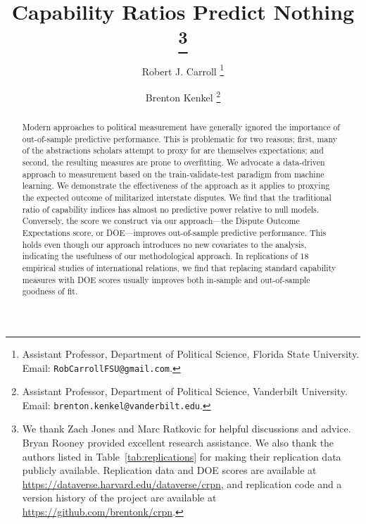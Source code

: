 \documentclass[11pt,oneside]{article}
\title{
  Capability Ratios Predict Nothing%
  \thanks{%
    We thank Zach Jones and Marc Ratkovic for helpful discussions and advice.
    Bryan Rooney provided excellent research assistance.
    We also thank the authors listed in Table~\ref{tab:replications} for making their replication data publicly available.
    Replication data and DOE scores are available at \url{https://dataverse.harvard.edu/dataverse/crpn}, and replication code and a version history of the project are available at \url{https://github.com/brentonk/crpn}.
  }%
}
\author{%
  Robert J. Carroll%
  \thanks{%
    Assistant Professor, Department of Political Science, Florida State University.  Email:  \nolinkurl{RobCarrollFSU@gmail.com}.
  }%
  \and%
  Brenton Kenkel%
  \thanks{
    Assistant Professor, Department of Political Science, Vanderbilt University.
    Email: \nolinkurl{brenton.kenkel@vanderbilt.edu}.
  }%
}
\begin{document}
\maketitle

\begin{abstract}
  Modern approaches to political measurement have generally ignored the importance of out-of-sample predictive performance. 
  This is problematic for two reasons; first, many of the abstractions scholars attempt to proxy for are themselves expectations; and second, the resulting measures are prone to overfitting. 
  We advocate a data-driven approach to measurement based on the train-validate-test paradigm from machine learning. 
  We demonstrate the effectiveness of the approach as it applies to proxying the expected outcome of militarized interstate disputes. 
  We find that the traditional ratio of capability indices has almost no predictive power relative to null models. 
  Conversely, the score we construct via our approach---the Dispute Outcome Expectations score, or DOE---improves out-of-sample predictive performance. 
  This holds even though our approach introduces no new covariates to the analysis, indicating the usefulness of our methodological approach.
  In replications of 18 empirical studies of international relations, we find that replacing standard capability measures with DOE scores usually improves both in-sample and out-of-sample goodness of fit.
\end{abstract}

\clearpage




















\clearpage
\appendix


\newpage


\end{document}
